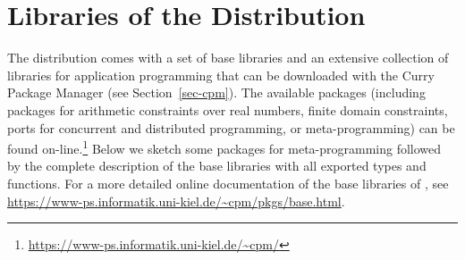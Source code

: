 \section{Libraries of the \CYS Distribution}
\label{sec:libraries}

{\setlength{\parindent}{0.0cm}

The \CYS distribution comes with a set of base libraries
and an extensive collection of libraries for application programming
that can be downloaded with the Curry Package Manager
(see Section~\ref{sec-cpm}).
The available packages (including packages
for arithmetic constraints over real numbers,
finite domain constraints,
ports for concurrent and distributed programming, or
meta-programming) can be found on-line.\footnote{%
\url{https://www-ps.informatik.uni-kiel.de/~cpm/}}
Below we sketch some packages for meta-programming
followed by the complete description of the base libraries
with all exported types and functions.
For a more detailed online documentation of the base libraries of \CYS,
see \url{https://www-ps.informatik.uni-kiel.de/~cpm/pkgs/base.html}.

}
